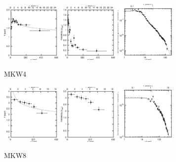 \documentclass[structabstract]{aa}
\begin{document}
\begin{figure}[h]
   \centering
   \includegraphics[width=0.26\textwidth]{tprofile_mkw4.eps}
   \includegraphics[width=0.26\textwidth]{zprofile_mkw4.eps}
   \includegraphics[width=0.26\textwidth]{sbps_mkw4.eps}
   \caption{MKW4}
   \label{fig:tprofmkw4}%
\end{figure}
\begin{figure}[h]
   \centering
   \includegraphics[width=0.26\textwidth]{tprofile_mkw8.eps}
   \includegraphics[width=0.26\textwidth]{zprofile_mkw8.eps}
   \includegraphics[width=0.26\textwidth]{sbps_mkw8.eps}
   \caption{MKW8}
   \label{fig:tprofmkw8}%
\end{figure}
\end{document}
